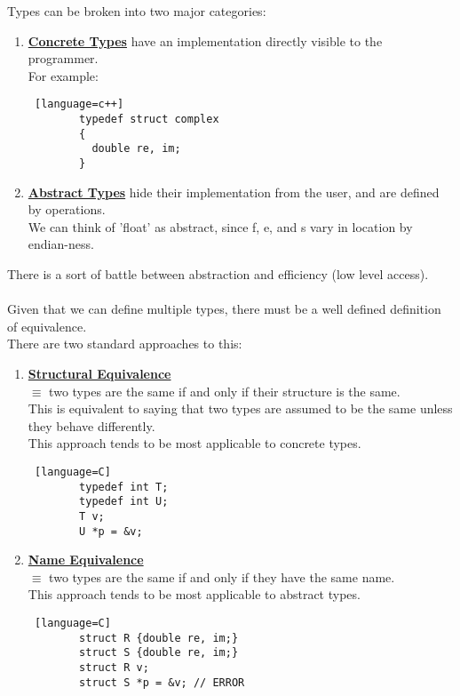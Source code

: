 \documentclass[../../lecture_notes.tex]{subfiles}
\begin{document}
Types can be broken into two major categories:
\begin{enumerate} [itemsep=0mm]
	\item \textbf{\underline{Concrete Types}} have an implementation directly visible to the programmer.\\
		For example:
			\begin{lstlisting} [language=c++]
		typedef struct complex
		{
		  double re, im;
		}
			\end{lstlisting}
	\item \textbf{\underline{Abstract Types}} hide their implementation from the user, and are defined by operations.\\
		We can think of 'float' as abstract, since f, e, and s vary in location by endian-ness.\\
\end{enumerate}
There is a sort of battle between abstraction and efficiency (low level access).\\
\\
Given that we can define multiple types, there must be a well defined definition of equivalence.\\
There are two standard approaches to this:
\begin{enumerate} [itemsep=0mm]
	\item \textbf{\underline{Structural Equivalence}}\\
		$\equiv$ two types are the same if and only if their structure is the same.\\
		This is equivalent to saying that two types are assumed to be the same unless they behave differently.\\
		This approach tends to be most applicable to concrete types.
		\begin{lstlisting} [language=C]
		typedef int T;
		typedef int U;
		T v;
		U *p = &v;
		\end{lstlisting}
	\item \textbf{\underline{Name Equivalence}}\\
		$\equiv$ two types are the same if and only if they have the same name.\\
		This approach tends to be most applicable to abstract types.
		\begin{lstlisting} [language=C]
		struct R {double re, im;}
		struct S {double re, im;}
		struct R v;
		struct S *p = &v; // ERROR
		\end{lstlisting}
\end{enumerate}
\end{document}
